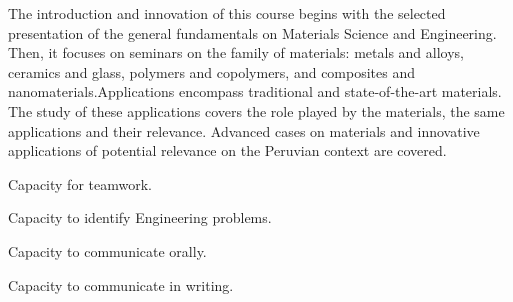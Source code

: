 
\begin{syllabus}


\begin{justification}
The introduction and innovation of this course begins with the selected presentation of the general fundamentals on Materials Science and Engineering.
Then, it focuses on seminars on the family of materials: metals and alloys, ceramics and glass, polymers and copolymers, and composites and nanomaterials.Applications encompass traditional and state-of-the-art materials. 
The study of these applications covers the role played by the materials, the same applications and their relevance. Advanced cases on materials and innovative applications of potential relevance on the Peruvian context are covered.

\end{justification}

\begin{goals}
\item Capacity for teamwork.
\item Capacity to identify Engineering problems.
\item Capacity to communicate orally.
\item Capacity to communicate in writing.

\end{goals}

\begin{outcomes}

% 


\end{outcomes}
\end{syllabus}
